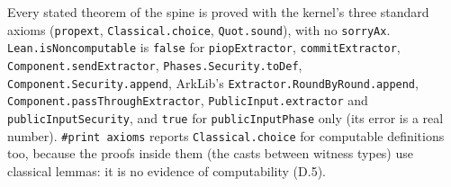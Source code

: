 Every stated theorem of the spine is proved with the kernel's three standard axioms (\texttt{propext}, \texttt{Classical.\allowbreak{}choice}, \texttt{Quot.\allowbreak{}sound}), with no \texttt{sorryAx}. \texttt{Lean.\allowbreak{}isNoncomputable} is \texttt{false} for \texttt{piopExtractor}, \texttt{commitExtractor}, \texttt{Component.\allowbreak{}sendExtractor}, \texttt{Phases.\allowbreak{}Security.\allowbreak{}toDef}, \texttt{Component.\allowbreak{}Security.\allowbreak{}append}, ArkLib's \texttt{E\allowbreak{}x\allowbreak{}t\allowbreak{}r\allowbreak{}a\allowbreak{}c\allowbreak{}t\allowbreak{}o\allowbreak{}r\allowbreak{}.\allowbreak{}R\allowbreak{}o\allowbreak{}u\allowbreak{}n\allowbreak{}d\allowbreak{}B\allowbreak{}y\allowbreak{}R\allowbreak{}o\allowbreak{}u\allowbreak{}n\allowbreak{}d\allowbreak{}.\allowbreak{}a\allowbreak{}p\allowbreak{}p\allowbreak{}e\allowbreak{}n\allowbreak{}d}, \texttt{C\allowbreak{}o\allowbreak{}m\allowbreak{}p\allowbreak{}o\allowbreak{}n\allowbreak{}e\allowbreak{}n\allowbreak{}t\allowbreak{}.\allowbreak{}p\allowbreak{}a\allowbreak{}s\allowbreak{}s\allowbreak{}T\allowbreak{}h\allowbreak{}r\allowbreak{}o\allowbreak{}u\allowbreak{}g\allowbreak{}h\allowbreak{}E\allowbreak{}x\allowbreak{}t\allowbreak{}r\allowbreak{}a\allowbreak{}c\allowbreak{}t\allowbreak{}o\allowbreak{}r}, \texttt{PublicInput.\allowbreak{}extractor} and \texttt{publicInputSecurity}, and \texttt{true} for \texttt{publicInputPhase} only (its error is a real number). \texttt{\#print axioms} reports \texttt{Classical.\allowbreak{}choice} for computable definitions too, because the proofs inside them (the casts between witness types) use classical lemmas: it is no evidence of computability (D.5).


